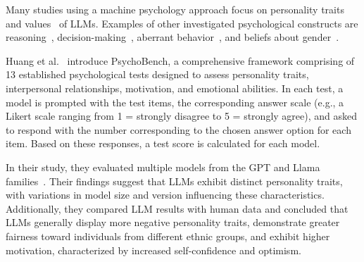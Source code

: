 \documentclass{DESSThesis}
\begin{document}
Many studies using a machine psychology approach focus on personality traits~\cite{huang_humanity_2023, miotto_who_2022, pellert_ai_2024, serapio-garcia_personality_2023} and values~\cite{fischer_what_2023, miotto_who_2022, pellert_ai_2024} of LLMs. Examples of other investigated psychological constructs are reasoning~\cite{almeida_exploring_2024, binz_using_2023}, decision-making~\cite{binz_using_2023}, aberrant behavior~\cite{coda-forno_inducing_2023}, and beliefs about gender~\cite{pellert_ai_2024}.

Huang et al.~\cite{huang_humanity_2023} introduce PsychoBench, a comprehensive framework comprising of 13 established psychological tests designed to assess personality traits, interpersonal relationships, motivation, and emotional abilities. In each test, a model is prompted with the test items, the corresponding answer scale (e.g., a Likert scale ranging from 1 = strongly disagree to 5 = strongly agree), and asked to respond with the number corresponding to the chosen answer option for each item. Based on these responses, a test score is calculated for each model.

In their study, they evaluated multiple models from the GPT and Llama families~\cite{huang_humanity_2023}. Their findings suggest that LLMs exhibit distinct personality traits, with variations in model size and version influencing these characteristics. Additionally, they compared LLM results with human data and concluded that LLMs generally display more negative personality traits, demonstrate greater fairness toward individuals from different ethnic groups, and exhibit higher motivation, characterized by increased self-confidence and optimism.


\end{document}
